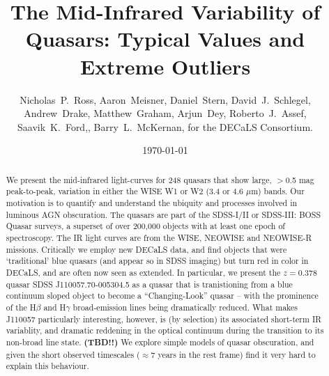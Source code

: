 \documentclass{emulateapj}
\begin{document}

\title{The Mid-Infrared Variability of Quasars: 
         Typical Values and Extreme Outliers
}
\author{
Nicholas~P.~Ross, 
Aaron~Meisner, 
Daniel~Stern,
David~J.~Schlegel,
Andrew~Drake, 
Matthew~Graham, 
Arjun~Dey,
Roberto~J.~Assef,
Saavik~K.~Ford,, 
Barry~L.~McKernan,
for the DECaLS Consortium. 
}


\date{\today}

\begin{abstract}
We present the mid-infrared light-curves for 248 quasars that show
large, $>$0.5 mag peak-to-peak, variation in either the WISE W1 or W2
(3.4 or 4.6 $\mu$m) bands. Our motivation is to quantify and
understand the ubiquity and processes involved in luminous AGN
obscuration.  The quasars are part of the SDSS-I/II or SDSS-III: BOSS
Quasar surveys, a superset of over 200,000 objects with at least one
epoch of spectroscopy. The IR light curves are from the WISE, NEOWISE
and NEOWISE-R missions.
Critically we employ new DECaLS data, and find objects that were
`traditional' blue quasars (and appear so in SDSS imaging) but turn
red in color in DECaLS, and are often now seen as extended.
In particular, we present the $z=0.378$ quasar SDSS
J110057.70-005304.5 as a quasar that is tranistioning from a blue
continuum sloped object to become a ``Changing-Look'' quasar -- with the
prominence of the H$\beta$ and H$\gamma$ broad-emission lines being
dramatically reduced. What makes J110057 particularly interesting,
however, is (by selection) its associated short-term IR variablity,
and dramatic reddening in the optical continuum during the transition
to its non-broad line state.
{\bf (TBD!!)} We explore simple models of quasar obscuration, and
given the short observed timescales ($\approx$7 years in the rest
frame) find it very hard to explain this behaviour.
\end{abstract}
\end{document}
